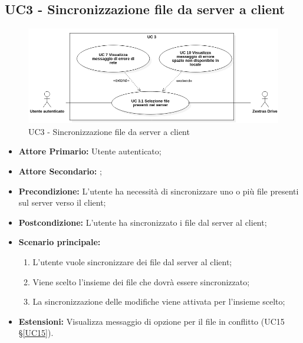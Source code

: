 \subsection{UC3 - Sincronizzazione file da server a client}
\label{UC3}
\begin{figure}[H]
    \centering
    \includegraphics[scale = 0.5]{components/img/UC3.png}
    \caption{UC3 - Sincronizzazione file da server a client}
\end{figure}
\begin{itemize}
\item \textbf{Attore Primario:} Utente autenticato;
\item \textbf{Attore Secondario:} ;
\item \textbf{Precondizione:} L'utente ha necessità di sincronizzare uno o più file presenti sul server verso il client;
\item \textbf{Postcondizione:} L'utente ha sincronizzato i file dal server al client;
\item \textbf{Scenario principale:}
    \begin{enumerate}
    \item L'utente vuole sincronizzare dei file dal server al client;
    \item Viene scelto l'insieme dei file che dovrà essere sincronizzato;
    \item La sincronizzazione delle modifiche viene attivata per l'insieme scelto;
    \end{enumerate}
\item \textbf{Estensioni:} Visualizza messaggio di opzione per il file in conflitto (UC15 \S{}\ref{UC15}).
\end{itemize}

